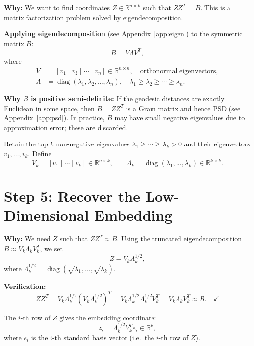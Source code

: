\documentclass[11pt]{article}
\begin{document}
\textbf{Why:} We want to find coordinates $Z \in \mathbb{R}^{n \times k}$ such that
$ZZ^T = B$. This is a matrix factorization problem solved by eigendecomposition.

\textbf{Applying eigendecomposition} (see Appendix~\ref{app:eigen}) to the symmetric
matrix $B$:
\[
  B = V \Lambda V^T,
\]
where
\begin{align*}
  V &= [v_1 \mid v_2 \mid \cdots \mid v_n] \in \mathbb{R}^{n \times n}, \quad
      \text{orthonormal eigenvectors},\\
  \Lambda &= \operatorname{diag}(\lambda_1, \lambda_2, \dots, \lambda_n), \quad
      \lambda_1 \geq \lambda_2 \geq \cdots \geq \lambda_n.
\end{align*}

\textbf{Why $B$ is positive semi-definite:} If the geodesic distances are exactly
Euclidean in some space, then $B = ZZ^T$ is a Gram matrix and hence PSD (see
Appendix~\ref{app:psd}). In practice, $B$ may have small negative eigenvalues due to
approximation error; these are discarded.

Retain the top $k$ non-negative eigenvalues $\lambda_1 \geq \cdots \geq \lambda_k > 0$
and their eigenvectors $v_1, \dots, v_k$. Define
\[
  V_k = [v_1 \mid \cdots \mid v_k] \in \mathbb{R}^{n \times k}, \qquad
  \Lambda_k = \operatorname{diag}(\lambda_1, \dots, \lambda_k) \in \mathbb{R}^{k \times k}.
\]

\section*{Step 5: Recover the Low-Dimensional Embedding}

\textbf{Why:} We need $Z$ such that $ZZ^T \approx B$. Using the truncated
eigendecomposition $B \approx V_k \Lambda_k V_k^T$, we set
\[
  Z = V_k \Lambda_k^{1/2},
\]
where $\Lambda_k^{1/2} = \operatorname{diag}(\sqrt{\lambda_1}, \dots, \sqrt{\lambda_k})$.

\textbf{Verification:}
\[
  ZZ^T = V_k \Lambda_k^{1/2} \left(V_k \Lambda_k^{1/2}\right)^T
       = V_k \Lambda_k^{1/2} \Lambda_k^{1/2} V_k^T
       = V_k \Lambda_k V_k^T \approx B. \quad \checkmark
\]

The $i$-th row of $Z$ gives the embedding coordinate:
\[
  z_i = \Lambda_k^{1/2} V_k^T e_i \in \mathbb{R}^k,
\]
where $e_i$ is the $i$-th standard basis vector (i.e.\ the $i$-th row of $Z$).

\end{document}
